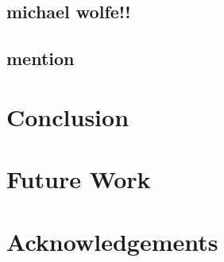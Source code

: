 \documentclass[11pt, twocolumn]{article}
\begin{document}
    \subsection{michael wolfe!!}
    \subsection{mention} %

\section{Conclusion} %

\section{Future Work} %
\section{Acknowledgements} %
\end{document}
